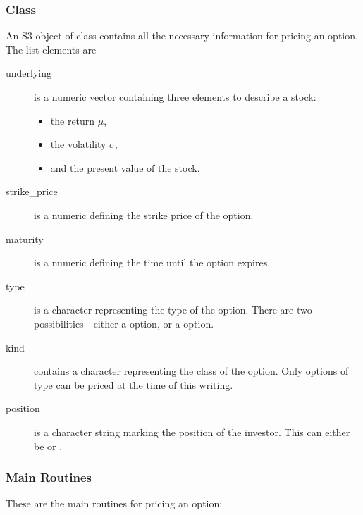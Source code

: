 \subsubsection{Class }

An S3 object of class  contains all
the necessary information for pricing an option. The list elements are

\begin{description}
\item[underlying] is a numeric vector containing three elements to
  describe a stock:
  \begin{itemize}
  \item the return $\mu$,
  \item the volatility $\sigma$,
  \item and the present value of the stock.
  \end{itemize}
\item[strike\_price] is a numeric defining the strike price of the option.
\item[maturity] is a numeric defining the time until the option expires.
\item[type] is a character representing the type of the option. There
  are two possibilities---either a  option, or a
   option.
\item[kind] contains a character representing the class of the
  option. Only options of type  can be priced at
  the time of this writing. 
\item[position] is a character string marking the position of the
  investor. This can either be  or .
\end{description}


\subsubsection{Main Routines}

These are the main routines for pricing an option:

